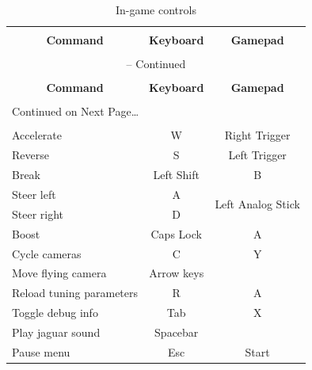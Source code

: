 \documentclass[11pt]{article}
\begin{document}
\begin{center}
\begin{longtable}{lcc}
\caption{In-game controls} \label{ingame-controls-table} \\

\hline \hline \\[-2ex]
   \multicolumn{1}{c}{\textbf{Command}} &
   \multicolumn{1}{c}{\textbf{Keyboard}} &
   \multicolumn{1}{c}{\textbf{Gamepad}} \\[0.5ex] \hline
   \\[-1.8ex]
\endfirsthead

\multicolumn{3}{c}{{\tablename} \thetable{} -- Continued} \\[0.5ex]
  \hline \hline \\[-2ex]
  \multicolumn{1}{c}{\textbf{Command}} &
  \multicolumn{1}{c}{\textbf{Keyboard}} &
  \multicolumn{1}{c}{\textbf{Gamepad}} \\[0.5ex] \hline
  \\[-1.8ex]
\endhead

  \multicolumn{3}{l}{{Continued on Next Page\ldots}} \\
\endfoot

  \\[-1.8ex] \hline \hline
\endlastfoot

Accelerate & W & Right Trigger \\ 
Reverse & S & Left Trigger \\
Break & Left Shift & B \\ 
Steer left & A & \multirow{2}{*}{Left Analog Stick} \\ 
Steer right & D \\
Boost & Caps Lock & A \\
Cycle cameras & C & Y \\
Move flying camera & Arrow keys &  \\
Reload tuning parameters & R & A \\
Toggle debug info & Tab & X \\
Play jaguar sound & Spacebar &  \\
Pause menu & Esc & Start \\
\end{longtable}
\end{center}
\end{document}
